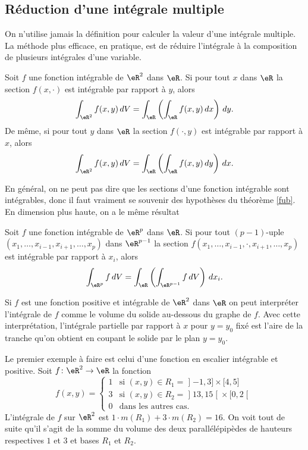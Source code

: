 \subsection{Réduction d'une intégrale multiple}
On n'utilise jamais la définition pour calculer la valeur d'une intégrale multiple. La méthode plus efficace, en pratique, est de réduire l'intégrale à la composition de plusieurs intégrales d'une variable.  
\begin{theorem}[de Fubini]\label{fub}
 Soit $f$ une fonction intégrable de $\eR^2$ dans $\eR$. Si pour tout $x$ dans $\eR$ la section $f(x,\cdot)$ est intégrable par rapport à $y$, alors
\[
\int_{\eR^2}f(x,y)\,dV=\int_{\eR}\left(\int_{\eR}f(x,y)\,dx\right)\,dy.
\]
De même, si pour tout $y$ dans $\eR$ la section $f(\cdot, y)$ est intégrable par rapport à $x$, alors
\[
\int_{\eR^2}f(x,y)\,dV=\int_{\eR}\left(\int_{\eR}f(x,y)\,dy\right)\,dx.
\] 
\end{theorem}		\label{ThoSectionINte}
En général, on ne peut pas dire que les sections d'une fonction intégrable sont intégrables, donc il faut vraiment se souvenir des hypothèses du théorème \ref{fub}. En dimension plus haute, on a le même résultat
\begin{theorem}
 Soit $f$ une fonction intégrable de $\eR^p$ dans $\eR$. Si pour tout $(p-1)$-uple $(x_1,\ldots, x_{i-1},x_{i+1}, \ldots, x_p)$ dans $\eR^{p-1}$ la section $f(x_1,\ldots, x_{i-1},\cdot,x_{i+1}, \ldots, x_p)$ est intégrable par rapport à $x_i$, alors
\[
\int_{\eR^p}f \,dV=\int_{\eR}\left(\int_{\eR^{p-1}}f \,dV\right)\,dx_i.
\]
\end{theorem}

 Si $f$ est une fonction positive et intégrable de $\eR^2$ dans $\eR$ on peut interpréter l'intégrale de $f$ comme le volume du solide au-dessous du graphe de $f$.  Avec cette interprétation,  l'intégrale partielle par rapport à $x$ pour $y=y_0$ fixé est l'aire de la tranche qu'on obtient en coupant le solide par le plan $y=y_0$.

 \begin{example}
   Le premier exemple à faire est celui d'une fonction en escalier intégrable et positive. Soit $f\colon \eR^2\to \eR$ la fonction
\begin{equation}
	f(x,y)=\begin{cases}
		1	&	\text{si $(x,y)\in R_1=\mathopen] -1 , 3 \mathclose]\times\mathopen[ 4 , 5 \mathclose]$}\\
		3	&	 \text{si $(x,y)\in R_2=\mathopen] 13 , 15 \mathclose[\times\mathopen[ 0 , 2 \mathclose[$}\\
		0	&	 \text{dans les autres cas.}
	\end{cases}
\end{equation}
L'intégrale de $f$ sur $\eR^2$ est $1\cdot m(R_1)+ 3\cdot m(R_2)= 16$. On voit tout de suite qu'il s'agit de la somme du volume des deux parallélépipèdes de hauteurs respectives $1$ et $3$ et bases $R_1$ et $R_2$. 
 \end{example}

